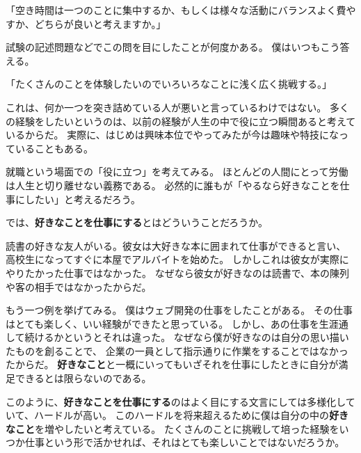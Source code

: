 \documentclass[]{tarticle}
\begin{document}
「空き時間は一つのことに集中するか、もしくは様々な活動にバランスよく費やすか、どちらが良いと考えますか。」

試験の記述問題などでこの問を目にしたことが何度かある。
僕はいつもこう答える。

「たくさんのことを体験したいのでいろいろなことに浅く広く挑戦する。」

これは、何か一つを突き詰めている人が悪いと言っているわけではない。
多くの経験をしたいというのは、以前の経験が人生の中で役に立つ瞬間あると考えているからだ。
実際に、はじめは興味本位でやってみたが今は趣味や特技になっていることもある。

就職という場面での「役に立つ」を考えてみる。
ほとんどの人間にとって労働は人生と切り離せない義務である。
必然的に誰もが「やるなら好きなことを仕事にしたい」と考えるだろう。

では、{\bf 好きなことを仕事にする}とはどういうことだろうか。

読書の好きな友人がいる。彼女は大好きな本に囲まれて仕事ができると言い、
高校生になってすぐに本屋でアルバイトを始めた。
しかしこれは彼女が実際にやりたかった仕事ではなかった。
なぜなら彼女が好きなのは読書で、本の陳列や客の相手ではなかったからだ。

もう一つ例を挙げてみる。
僕はウェブ開発の仕事をしたことがある。
その仕事はとても楽しく、いい経験ができたと思っている。
しかし、あの仕事を生涯通して続けるかというとそれは違った。
なぜなら僕が好きなのは自分の思い描いたものを創ることで、
企業の一員として指示通りに作業をすることではなかったからだ。
{\bf 好きなこと}と一概にいってもいざそれを仕事にしたときに自分が満足できるとは限らないのである。

このように、{\bf 好きなことを仕事にする}のはよく目にする文言にしては多様化していて、ハードルが高い。
このハードルを将来超えるために僕は自分の中の{\bf 好きなこと}を増やしたいと考えている。
たくさんのことに挑戦して培った経験をいつか仕事という形で活かせれば、それはとても楽しいことではないだろうか。
\end{document}
